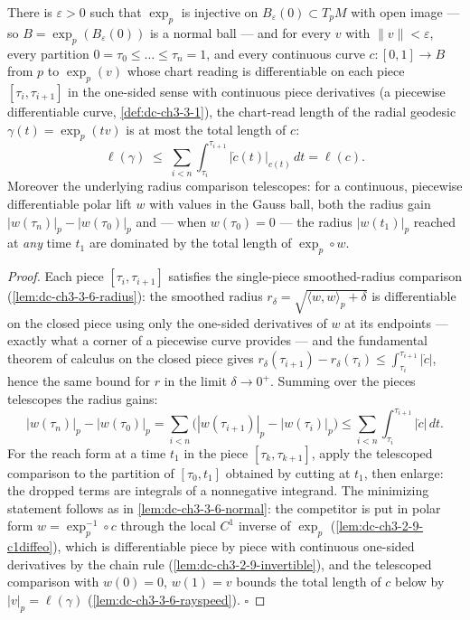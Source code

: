 \begin{lemma}
  \label{lem:dc-ch3-3-6-piecewise}
  \leanok
  There is $\varepsilon>0$ such that $\exp_p$ is injective on
  $B_\varepsilon(0)\subset T_pM$ with open image — so
  $B=\exp_p(B_\varepsilon(0))$ is a normal ball — and for every $v$ with
  $\|v\|<\varepsilon$, every partition $0=\tau_0\le\dots\le\tau_n=1$, and
  every continuous curve $c:[0,1]\to B$ from $p$ to $\exp_p(v)$ whose chart
  reading is differentiable on each piece $[\tau_i,\tau_{i+1}]$ in the
  one-sided sense with continuous piece derivatives (a piecewise
  differentiable curve, \cref{def:dc-ch3-3-1}), the chart-read length of the
  radial geodesic $\gamma(t)=\exp_p(tv)$ is at most the total length of $c$:
  $$\ell(\gamma)\;\le\;\sum_{i<n}\int_{\tau_i}^{\tau_{i+1}}
    \big|\dot c(t)\big|_{c(t)}\,dt=\ell(c).$$
  Moreover the underlying radius comparison telescopes: for a continuous,
  piecewise differentiable polar lift $w$ with values in the Gauss ball, both
  the radius gain $|w(\tau_n)|_p-|w(\tau_0)|_p$ and — when $w(\tau_0)=0$ —
  the radius $|w(t_1)|_p$ reached at \emph{any} time $t_1$ are dominated by
  the total length of $\exp_p\circ w$.
\end{lemma}
\begin{proof}
  \leanok
  Each piece $[\tau_i,\tau_{i+1}]$ satisfies the single-piece smoothed-radius
  comparison (\cref{lem:dc-ch3-3-6-radius}): the smoothed radius
  $r_\delta=\sqrt{\langle w,w\rangle_p+\delta}$ is differentiable on the
  closed piece using only the one-sided derivatives of $w$ at its endpoints —
  exactly what a corner of a piecewise curve provides — and the fundamental
  theorem of calculus on the closed piece gives
  $r_\delta(\tau_{i+1})-r_\delta(\tau_i)\le\int_{\tau_i}^{\tau_{i+1}}|\dot c|$,
  hence the same bound for $r$ in the limit $\delta\to0^+$. Summing over the
  pieces telescopes the radius gains:
  $$|w(\tau_n)|_p-|w(\tau_0)|_p
    =\sum_{i<n}\big(|w(\tau_{i+1})|_p-|w(\tau_i)|_p\big)
    \le\sum_{i<n}\int_{\tau_i}^{\tau_{i+1}}|\dot c|\,dt.$$
  For the reach form at a time $t_1$ in the piece $[\tau_k,\tau_{k+1}]$, apply
  the telescoped comparison to the partition of $[\tau_0,t_1]$ obtained by
  cutting at $t_1$, then enlarge: the dropped terms are integrals of a
  nonnegative integrand. The minimizing statement follows as in
  \cref{lem:dc-ch3-3-6-normal}: the competitor is put in polar form
  $w=\exp_p^{-1}\circ c$ through the local $C^1$ inverse of $\exp_p$
  (\cref{lem:dc-ch3-2-9-c1diffeo}), which is differentiable piece by piece
  with continuous one-sided derivatives by the chain rule
  (\cref{lem:dc-ch3-2-9-invertible}), and the telescoped comparison with
  $w(0)=0$, $w(1)=v$ bounds the total length of $c$ below by
  $|v|_p=\ell(\gamma)$ (\cref{lem:dc-ch3-3-6-rayspeed}). $\square$
\end{proof}

